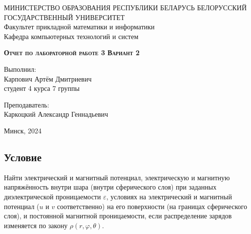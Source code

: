 \documentclass[11pt]{article}
\begin{document}
    \begin{titlepage}
    \newpage
    
    \begin{center}
    МИНИСТЕРСТВО ОБРАЗОВАНИЯ РЕСПУБЛИКИ БЕЛАРУСЬ БЕЛОРУССКИЙ ГОСУДАРСТВЕННЫЙ УНИВЕРСИТЕТ \\
    Факультет прикладной математики и информатики \\ Кафедра компьютерных технологий и систем
    \end{center}
    
    \vspace{8em}
    
    \vspace{2em}
    
    \begin{center}
    \textsc{\textbf{Отчет по лабораторной работе 3
    \linebreak Вариант 2}}
    \end{center}
    
    \vspace{6em}
    
    \begin{flushright}
        Выполнил:\\
        Карпович Артём Дмитриевич\\
        студент 4 курса 7 группы
    \end{flushright}

    \begin{flushright}
        Преподаватель:\\
        Каркоцкий Александр Геннадьевич
    \end{flushright}
    \vspace{\fill}
    
    \begin{center}
    Минск, 2024
    \end{center}
    
    \end{titlepage}

\begin{center}
    \section*{Условие}
\end{center}
Найти электрический и магнитный потенциал, электрическую и магнитную напряжённость внутри шара (внутри сферического слоя) при заданных диэлектрической проницаемости $\varepsilon$, условиях на электрический и магнитный потенциал ($u$ и $v$ соответственно) на его
поверхности (на границах сферического слоя), и постоянной магнитной проницаемости,
если распределение зарядов изменяется по закону $\rho(r, \varphi, \theta)$.
\end{document}
